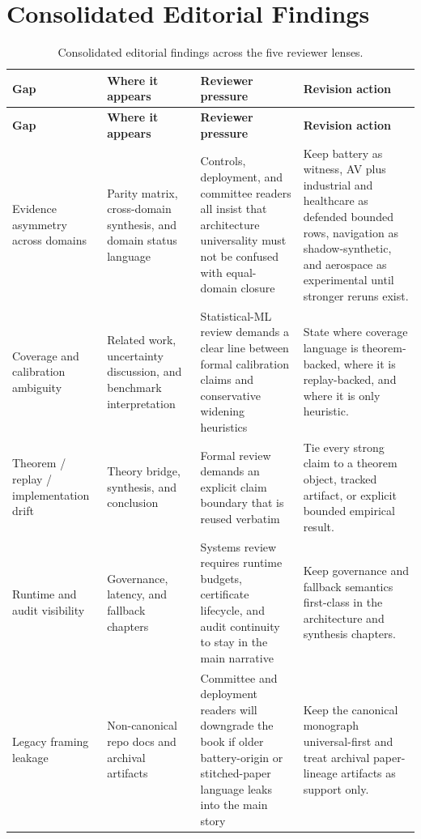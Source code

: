 \section{Consolidated Editorial Findings}
\begin{longtable}{p{}p{}p{}p{}}
\caption{Consolidated editorial findings across the five reviewer lenses.}\label{tab:reviewer-gap-matrix}\\
\toprule
\textbf{Gap} & \textbf{Where it appears} & \textbf{Reviewer pressure} & \textbf{Revision action}\\
\midrule
\endfirsthead
\toprule
\textbf{Gap} & \textbf{Where it appears} & \textbf{Reviewer pressure} & \textbf{Revision action}\\
\midrule
\endhead
Evidence asymmetry across domains & Parity matrix, cross-domain synthesis, and domain status language & Controls, deployment, and committee readers all insist that architecture universality must not be confused with equal-domain closure & Keep battery as witness, AV plus industrial and healthcare as defended bounded rows, navigation as shadow-synthetic, and aerospace as experimental until stronger reruns exist.\\
Coverage and calibration ambiguity & Related work, uncertainty discussion, and benchmark interpretation & Statistical-ML review demands a clear line between formal calibration claims and conservative widening heuristics & State where coverage language is theorem-backed, where it is replay-backed, and where it is only heuristic.\\
Theorem / replay / implementation drift & Theory bridge, synthesis, and conclusion & Formal review demands an explicit claim boundary that is reused verbatim & Tie every strong claim to a theorem object, tracked artifact, or explicit bounded empirical result.\\
Runtime and audit visibility & Governance, latency, and fallback chapters & Systems review requires runtime budgets, certificate lifecycle, and audit continuity to stay in the main narrative & Keep governance and fallback semantics first-class in the architecture and synthesis chapters.\\
Legacy framing leakage & Non-canonical repo docs and archival artifacts & Committee and deployment readers will downgrade the book if older battery-origin or stitched-paper language leaks into the main story & Keep the canonical monograph universal-first and treat archival paper-lineage artifacts as support only.\\
\bottomrule
\end{longtable}

